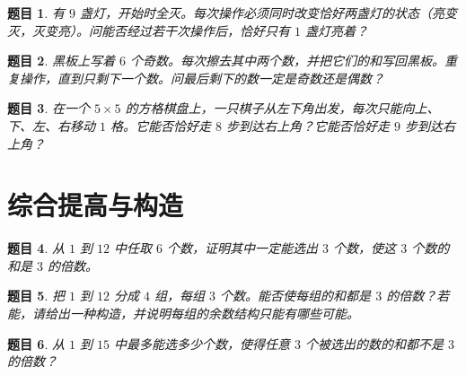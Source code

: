 \documentclass[11pt,a4paper,fontset=fandol]{ctexart}
\theoremstyle{formalexample}
\newtheorem{exercise}{题目}[section]
\begin{document}
\begin{exercise}
有 $9$ 盏灯，开始时全灭。每次操作必须同时改变恰好两盏灯的状态（亮变灭，灭变亮）。问能否经过若干次操作后，恰好只有 $1$ 盏灯亮着？
\end{exercise}

\begin{exercise}
黑板上写着 $6$ 个奇数。每次擦去其中两个数，并把它们的和写回黑板。重复操作，直到只剩下一个数。问最后剩下的数一定是奇数还是偶数？
\end{exercise}

\begin{exercise}
在一个 $5\times 5$ 的方格棋盘上，一只棋子从左下角出发，每次只能向上、下、左、右移动 $1$ 格。它能否恰好走 $8$ 步到达右上角？它能否恰好走 $9$ 步到达右上角？
\end{exercise}

\begin{center}
\end{center}

\section{综合提高与构造}

\begin{exercise}
从 $1$ 到 $12$ 中任取 $6$ 个数，证明其中一定能选出 $3$ 个数，使这 $3$ 个数的和是 $3$ 的倍数。
\end{exercise}

\begin{exercise}
把 $1$ 到 $12$ 分成 $4$ 组，每组 $3$ 个数。能否使每组的和都是 $3$ 的倍数？若能，请给出一种构造，并说明每组的余数结构只能有哪些可能。
\end{exercise}

\begin{exercise}
从 $1$ 到 $15$ 中最多能选多少个数，使得任意 $3$ 个被选出的数的和都不是 $3$ 的倍数？
\end{exercise}
\end{document}
